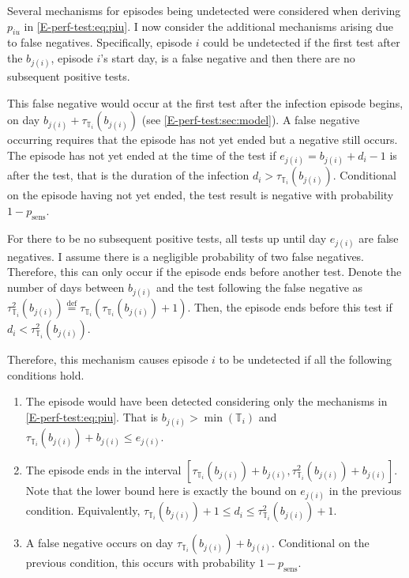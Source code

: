 \documentclass[12pt, letterpaper]{article} %
\newcommand{\psens}{p_\text{sens}}
\newcommand{\sched}{\mathbb{T}}
\begin{document}
Several mechanisms for episodes being undetected were considered when deriving $p_{iu}$ in \cref{E-perf-test:eq:piu}.
I now consider the additional mechanisms arising due to false negatives.
Specifically, episode $i$ could be undetected if the first test after the $b_{j(i)}$, episode $i$'s start day, is a false negative and then there are no subsequent positive tests.

This false negative would occur at the first test after the infection episode begins, on day $b_{j(i)} + \tau_{\sched_i}(b_{j(i)})$ (see \cref{E-perf-test:sec:model}).
A false negative occurring requires that the episode has not yet ended but a negative still occurs.
The episode has not yet ended at the time of the test if $e_{j(i)} = b_{j(i)} + d_i - 1$ is after the test, that is the duration of the infection $d_i > \tau_{\sched_i}(b_{j(i)})$.
Conditional on the episode having not yet ended, the test result is negative with probability $1 - \psens$.

For there to be no subsequent positive tests, all tests up until day $e_{j(i)}$ are false negatives.
I assume there is a negligible probability of two false negatives.
Therefore, this can only occur if the episode ends before another test.
Denote the number of days between $b_{j(i)}$ and the test following the false negative as $\tau^2_{\sched_i}(b_{j(i)}) \stackrel{\text{def}}{=} \tau_{\sched_i}(\tau_{\sched_i}(b_{j(i)}) + 1)$.
Then, the episode ends before this test if $d_i < \tau^2_{\sched_i}(b_{j(i)})$.

Therefore, this mechanism causes episode $i$ to be undetected if all the following conditions hold.
\begin{enumerate}
    \item The episode would have been detected considering only the mechanisms in \cref{E-perf-test:eq:piu}. That is $b_{j(i)} > \min(\sched_i)$ and $\tau_{\sched_i}(b_{j(i)}) + b_{j(i)} \leq e_{j(i)}$.
    \item The episode ends in the interval $[\tau_{\sched_i}(b_{j(i)}) + b_{j(i)}, \tau^2_{\sched_i}(b_{j(i)}) + b_{j(i)}]$.
      Note that the lower bound here is exactly the bound on $e_{j(i)}$ in the previous condition.
      Equivalently, $\tau_{\sched_i}(b_{j(i)}) + 1 \leq d_i \leq \tau^2_{\sched_i}(b_{j(i)}) + 1$.
    \item A false negative occurs on day $\tau_{\sched_i}(b_{j(i)}) + b_{j(i)}$. Conditional on the previous condition, this occurs with probability $1 - \psens$.
\end{enumerate}
\end{document}
